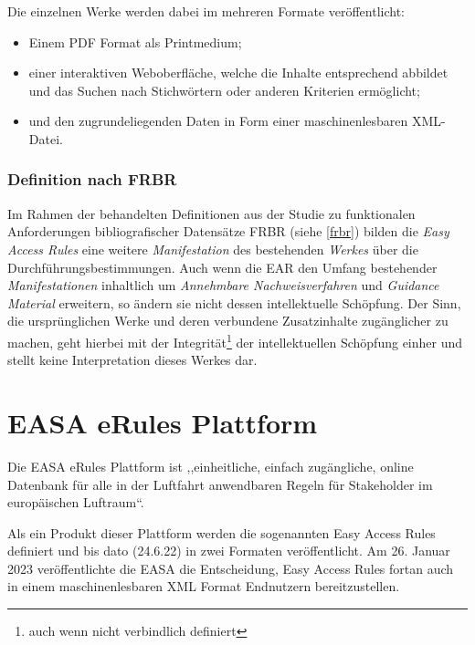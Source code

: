     \medskip
    \noindent
    Die einzelnen Werke werden dabei im mehreren Formate veröffentlicht:
    \begin{itemize}
        \item Einem PDF Format als Printmedium;
        \item einer interaktiven Weboberfläche, welche die Inhalte entsprechend abbildet und das Suchen nach Stichwörtern oder anderen Kriterien ermöglicht;
        \item  und den zugrundeliegenden Daten in Form einer maschinenlesbaren XML-Datei. \cite{easa_xml_export}
    \end{itemize}

\subsubsection{Definition nach FRBR}

    Im Rahmen der behandelten Definitionen aus der Studie zu funktionalen Anforderungen bibliografischer Datensätze \acs{FRBR} (siehe \ref{frbr}) bilden die \textit{Easy Access Rules} eine weitere \textit{Manifestation} des bestehenden \textit{Werkes} über die Durchführungsbestimmungen.
    Auch wenn die \ac{EAR} den Umfang bestehender \textit{Manifestationen} inhaltlich um \textit{Annehmbare Nachweisverfahren} und \textit{Guidance Material} erweitern, so ändern sie nicht dessen intellektuelle Schöpfung.
    Der Sinn, die ursprünglichen Werke und deren verbundene Zusatzinhalte zugänglicher zu machen, geht hierbei mit der Integrität\footnote{auch wenn nicht verbindlich definiert} der intellektuellen Schöpfung einher und stellt keine Interpretation dieses Werkes dar.

\pagebreak
\section{EASA eRules Plattform}

    Die \ac{EASA} eRules Plattform ist ,,einheitliche, einfach zugängliche, online Datenbank für alle in der Luftfahrt anwendbaren Regeln für Stakeholder im europäischen Luftraum``.
    \cite[5]{easa_xml_doc}

    \medskip
    Als ein Produkt dieser Plattform werden die sogenannten Easy Access Rules definiert und bis dato (24.6.22) in zwei Formaten veröffentlicht. 
    Am 26. Januar 2023 veröffentlichte die EASA die Entscheidung, Easy Access Rules fortan auch in einem maschinenlesbaren XML Format Endnutzern bereitzustellen. \cite{easa_xml_publication}

